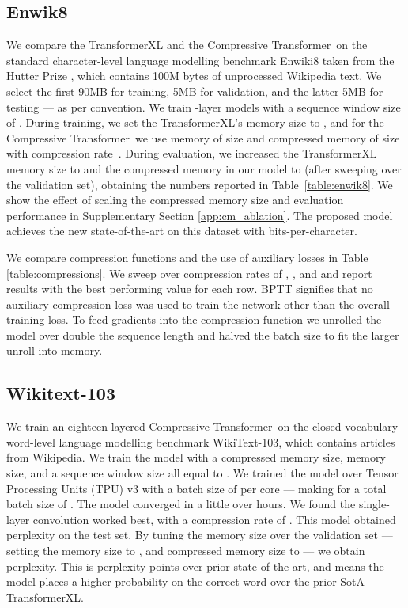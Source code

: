 \documentclass{article} \usepackage{iclr2020_conference,times}
\newcommand{\model}{Compressive Transformer}
\begin{document}
\subsection{Enwik8}
We compare the TransformerXL and the \model~on the standard character-level language modelling benchmark Enwiki8 taken from the Hutter Prize \citep{hutter2012human}, which contains 100M bytes of unprocessed Wikipedia text. We select the first 90MB for training, 5MB for validation, and the latter 5MB for testing --- as per convention.  We train -layer models with a sequence window size of . During training, we set the TransformerXL's memory size to , and for the \model~we use memory of size  and compressed memory of size  with compression rate~. During evaluation, we increased the TransformerXL memory size to  and the compressed memory in our model to  (after sweeping over the validation set), obtaining the numbers reported in Table~\ref{table:enwik8}. We show the effect of scaling the compressed memory size and evaluation performance in Supplementary Section \ref{app:cm_ablation}.
The proposed model achieves the new state-of-the-art on this dataset with  bits-per-character.

We compare compression functions and the use of auxiliary losses in Table \ref{table:compressions}. We sweep over compression rates of , , and  and report results with the best performing value for each row.
BPTT signifies that no auxiliary compression loss was used to train the network other than the overall training loss. To feed gradients into the compression function we unrolled the model over double the sequence length and halved the batch size to fit the larger unroll into memory.
\subsection{Wikitext-103}
We train an eighteen-layered \model~on the closed-vocabulary word-level language modelling benchmark WikiText-103, which contains articles from Wikipedia. We train the model with a compressed memory size, memory size, and a sequence window size all equal to . We trained the model over  Tensor Processing Units (TPU) v3 with a batch size of  per core --- making for a total batch size of . The model converged in a little over  hours. We found the single-layer convolution worked best, with a compression rate of . This model obtained  perplexity on the test set. By tuning the memory size over the validation set --- setting the memory size to , and compressed memory size to  --- we obtain  perplexity. This is  perplexity points over prior state of the art, and means the model places a  higher probability on the correct word over the prior SotA TransformerXL.
\end{document}
